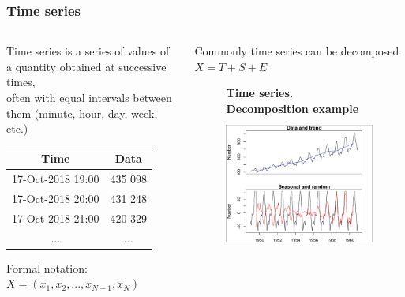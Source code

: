 \documentclass[intlimits, 9pt, unicode]{beamer}
\begin{document}
\begin{frame}
    \frametitle{Time series}
	
    {\begin{columns}
        \begin{column}{5.5cm}
 Time series is a series of values of a quantity obtained at successive times,\\ often with equal intervals between them (minute, hour, day, week, etc.)

\vspace{0.3cm}
\begin{table}[h!]
\centering
 \begin{tabular}{||c c||}
 \hline
 Time & Data \\ [0.5ex]
 \hline\hline
 17-Oct-2018 19:00 & 435 098 \\
 \hline
 17-Oct-2018 20:00 & 431 248  \\
 \hline
 17-Oct-2018 21:00 & 420 329  \\
 \hline
 ... & ... \\ [1ex]
 \hline
\end{tabular}
\end{table}

	
\vspace{0.3cm} Formal notation:
 $ X = (x_1, x_2, ... , x_{N-1} , x_N)  $

        \end{column}

\hspace{-0.5cm}
        \begin{column}{5cm}
Commonly time series can be decomposed $X = T + S + E$
        \begin{figure}
        \centering
	\textbf{Time series. Decomposition example}
        \includegraphics[height=4.5cm]{images/tsDecompPlot}
	\end{figure}
	
        \end{column}
    \end{columns}}
\end{frame}
\end{document}
